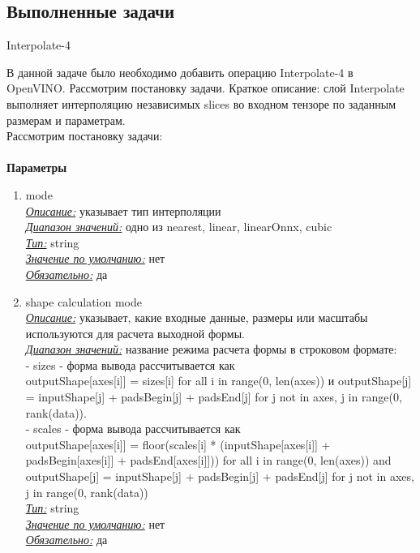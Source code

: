 \documentclass{article}
\begin{document}
    \newpage
    \begin{center} 
    \section{Выполненные задачи}
    \huge Interpolate-4
    \end{center}
    \large В данной задаче было необходимо добавить операцию Interpolate-4 в OpenVINO.
    Рассмотрим постановку задачи.
    Краткое описание: слой Interpolate выполняет интерполяцию независимых slices во входном тензоре по заданным размерам и параметрам.\\ Рассмотрим постановку задачи:\\ \\
    \textbf{Параметры}
    \begin{enumerate}
        \item mode\\
        
        \underline{\textit{Описание:}} указывает тип интерполяции\\
        \underline{\textit{Диапазон значений:}} одно из nearest, linear, linearOnnx, cubic\\
        \underline{\textit{Тип:}} string\\
        \underline{\textit{Значение по умолчанию:}} нет\\
        \underline{\textit{Обязательно:}} да\\
        
        \item shape calculation mode\\
        
        \underline{\textit{Описание:}} указывает, какие входные данные, размеры или масштабы используются для расчета выходной формы.\\
        \underline{\textit{Диапазон значений:}} название режима расчета формы в строковом формате:\\
        - sizes - форма вывода рассчитывается как \\
        outputShape[axes[i]] = sizes[i] for all i in range(0, len(axes)) и outputShape[j] = inputShape[j] + padsBegin[j] + padsEnd[j] for j not in axes, j in range(0, rank(data)).\\
        
        - scales - форма вывода рассчитывается как \\
        outputShape[axes[i]] = floor(scales[i] * (inputShape[axes[i]] + padsBegin[axes[i]] + padsEnd[axes[i]])) for all i in range(0, len(axes)) and outputShape[j] = inputShape[j] + padsBegin[j] + padsEnd[j] for j not in axes, j in range(0, rank(data))\\
        \underline{\textit{Тип:}} string\\
        \underline{\textit{Значение по умолчанию:}} нет\\
        \underline{\textit{Обязательно:}} да\\
        

\end{enumerate}
\end{document}
